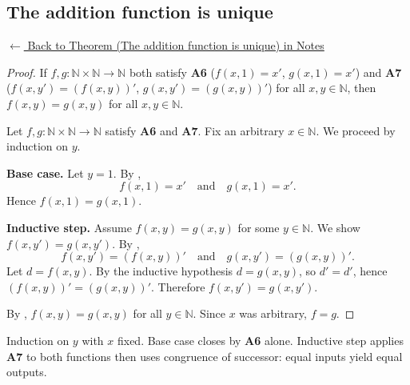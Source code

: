 
\subsection*{The addition function is unique}
\label{prf:landau-addition-unique}

\begin{remark*}[Return]
\hyperref[thm:landau-addition-unique]{$\leftarrow$ Back to Theorem
(The addition function is unique) in Notes}
\end{remark*}

\begin{proof}
\Claim If $f, g : \mathbb{N} \times \mathbb{N} \to \mathbb{N}$ both satisfy
\textbf{A6} ($f(x,1) = x'$, $g(x,1) = x'$) and \textbf{A7}
($f(x,y') = (f(x,y))'$, $g(x,y') = (g(x,y))'$) for all $x, y \in \mathbb{N}$,
then $f(x,y) = g(x,y)$ for all $x, y \in \mathbb{N}$.

Let $f, g : \mathbb{N} \times \mathbb{N} \to \mathbb{N}$ satisfy \textbf{A6}
and \textbf{A7}. Fix an arbitrary $x \in \mathbb{N}$. We proceed by induction
on $y$.

\textbf{Base case.} Let $y = 1$. By ,
\[
  f(x, 1) = x' \quad \text{and} \quad g(x, 1) = x'.
\]
Hence $f(x, 1) = g(x, 1)$.

\textbf{Inductive step.} Assume $f(x, y) = g(x, y)$ for some
$y \in \mathbb{N}$. We show $f(x, y') = g(x, y')$.
By ,
\[
  f(x, y') = (f(x, y))' \quad \text{and} \quad g(x, y') = (g(x, y))'.
\]
Let $d = f(x,y)$. By the inductive hypothesis $d = g(x,y)$, so $d' = d'$,
hence $(f(x,y))' = (g(x,y))'$. Therefore $f(x,y') = g(x,y')$.

By , $f(x,y) = g(x,y)$ for all $y \in \mathbb{N}$.
Since $x$ was arbitrary, $f = g$.
\end{proof}

\begin{remark*}
Induction on $y$ with $x$ fixed. Base case closes by \textbf{A6} alone.
Inductive step applies \textbf{A7} to both functions then uses congruence of
successor: equal inputs yield equal outputs.

\end{remark*}

